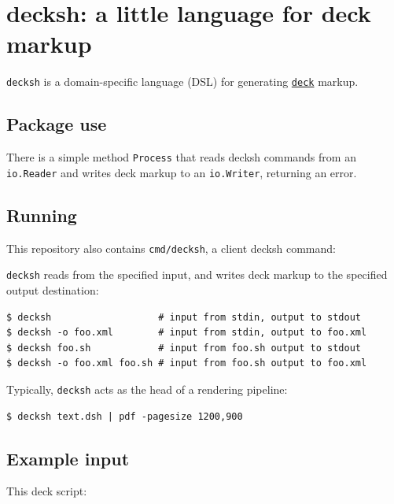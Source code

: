 \hypertarget{decksh-a-little-language-for-deck-markup}{%
\section{decksh: a little language for deck
markup}\label{decksh-a-little-language-for-deck-markup}}

\texttt{decksh} is a domain-specific language (DSL) for generating
\href{https://github.com/ajstarks/deck/blob/master/README.md}{\texttt{deck}}
markup.

\hypertarget{package-use}{%
\subsection{Package use}\label{package-use}}

There is a simple method \texttt{Process} that reads decksh commands
from an \texttt{io.Reader} and writes deck markup to an
\texttt{io.Writer}, returning an error.

\hypertarget{running}{%
\subsection{Running}\label{running}}

This repository also contains \texttt{cmd/decksh}, a client decksh
command:

\texttt{decksh} reads from the specified input, and writes deck markup
to the specified output destination:

\begin{verbatim}
$ decksh                   # input from stdin, output to stdout
$ decksh -o foo.xml        # input from stdin, output to foo.xml
$ decksh foo.sh            # input from foo.sh output to stdout
$ decksh -o foo.xml foo.sh # input from foo.sh output to foo.xml
\end{verbatim}

Typically, \texttt{decksh} acts as the head of a rendering pipeline:

\begin{verbatim}
$ decksh text.dsh | pdf -pagesize 1200,900 
\end{verbatim}

\hypertarget{example-input}{%
\subsection{Example input}\label{example-input}}

This deck script:

